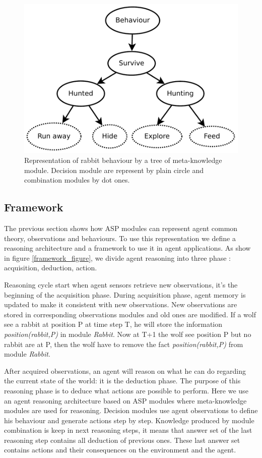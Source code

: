 \documentclass{aamas2012}
\begin{document}
	\begin{figure}
		\centering
		\includegraphics[keepaspectratio=true, scale=0.5]{behaviour_tree.pdf}
		\caption
		{
			\label{behaviour_tree}
			Representation of rabbit behaviour by a tree of meta-knowledge module.
			Decision module are represent by plain circle and combination modules by dot ones.
		}
	\end{figure}
	
\subsection{Framework}

	The previous section shows how ASP modules can represent agent common theory, observations and behaviours.
	To use this representation we define a reasoning architecture and a framework to use it in agent applications.
	As show in figure \ref{framework_figure}, we divide agent reasoning into three phase : acquisition, deduction, action.
	
	Reasoning cycle start when agent sensors retrieve new observations, it's the beginning of the acquisition phase.
	During acquisition phase, agent memory is updated to make it consistent with new observations.
	New observations are stored in corresponding observations modules and old ones are modified.
	If a wolf see a rabbit at position P at time step T, he will store the information \textit{position(rabbit,P)} in module \textit{Rabbit}.
	Now at T+1 the wolf see position P but no rabbit are at P, then the wolf have to remove the fact \textit{position(rabbit,P)} from module \textit{Rabbit}.
	
	After acquired observations, an agent will reason on what he can do regarding the current state of the world: it is the deduction phase.
	The purpose of this reasoning phase is to deduce what actions are possible to perform.
	Here we use an agent reasoning architecture based on ASP modules where meta-knowledge modules are used for reasoning.
	Decision modules use agent observations to define his behaviour and generate actions step by step.
	Knowledge produced by module combination is keep in next reasoning steps, 
	it means that answer set of the last reasoning step contains all deduction of previous ones.
	These last answer set contains actions and their consequences on the environment and the agent.
	
\end{document}
